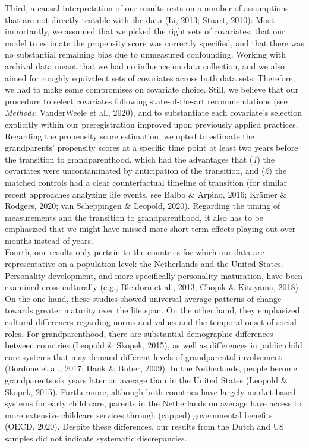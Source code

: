 \documentclass[
  english,
  man, noextraspace,floatsintext]{apa7}
\begin{document}
Third, a causal interpretation of our results rests on a number of assumptions that are not directly testable with the data (Li, 2013; Stuart, 2010): Most importantly, we assumed that we picked the right sets of covariates, that our model to estimate the propensity score was correctly specified, and that there was no substantial remaining bias due to unmeasured confounding. Working with archival data meant that we had no influence on data collection, and we also aimed for roughly equivalent sets of covariates across both data sets. Therefore, we had to make some compromises on covariate choice. Still, we believe that our procedure to select covariates following state-of-the-art recommendations (see \emph{Methods}; VanderWeele et al., 2020), and to substantiate each covariate's selection explicitly within our preregistration improved upon previously applied practices. Regarding the propensity score estimation, we opted to estimate the grandparents' propensity scores at a specific time point at least two years before the transition to grandparenthood, which had the advantages that (\emph{1}) the covariates were uncontaminated by anticipation of the transition, and (\emph{2}) the matched controls had a clear counterfactual timeline of transition (for similar recent approaches analyzing life events, see Balbo \& Arpino, 2016; Krämer \& Rodgers, 2020; van Scheppingen \& Leopold, 2020). Regarding the timing of measurements and the transition to grandparenthood, it also has to be emphasized that we might have missed more short-term effects playing out over months instead of years.\\
Fourth, our results only pertain to the countries for which our data are representative on a population level: the Netherlands and the United States. Personality development, and more specifically personality maturation, have been examined cross-culturally (e.g., Bleidorn et al., 2013; Chopik \& Kitayama, 2018). On the one hand, these studies showed universal average patterns of change towards greater maturity over the life span. On the other hand, they emphasized cultural differences regarding norms and values and the temporal onset of social roles. For grandparenthood, there are substantial demographic differences between countries (Leopold \& Skopek, 2015), as well as differences in public child care systems that may demand different levels of grandparental involvement (Bordone et al., 2017; Hank \& Buber, 2009). In the Netherlands, people become grandparents six years later on average than in the United States (Leopold \& Skopek, 2015). Furthermore, although both countries have largely market-based systems for early child care, parents in the Netherlands on average have access to more extensive childcare services through (capped) governmental benefits (OECD, 2020). Despite these differences, our results from the Dutch and US samples did not indicate systematic discrepancies.\\
\end{document}
